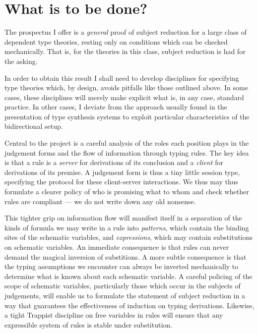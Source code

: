 \documentclass{jfp1}
\begin{document}
\section{What is to be done?}

The prospectus I offer is a \emph{general} proof of subject reduction for a
large class of dependent type theories, resting only on conditions which can
be checked mechanically. That is, for the theories in this class, subject
reduction is had for the asking.

In order to obtain this result I shall need to develop disciplines for
specifying type theories which, by design, avoids pitfalls like those
outlined above.  In some cases, these disciplines will merely make
explicit what is, in any case, standard practice. In other cases, I
deviate from the approach usually found in the presentation of type
synthesis systems to exploit particular characteristics of the
bidirectional setup.

Central to the project is a careful analysis of the roles each position
plays in the judgement forms and the flow of information through typing rules.
The key idea is that a rule is a \emph{server} for derivations of its conclusion
and a \emph{client} for derivations of its premise. A judgement form is thus a
tiny little session type, specifying the protocol for these client-server
interactions. We thus may thus formulate a clearer policy of who is promising
what to whom and check whether rules are compliant --- we do not write down
any old nonsense.

This tighter grip on information flow will manifest itself in a separation
of the kinds of formula we may write in a rule into \emph{patterns}, which contain
the binding sites of the schematic variables, and \emph{expressions}, which may
contain substitutions on schematic variables. An immediate consequence is
that rules can never demand the magical inversion of substitions. A more subtle
consequence is that the typing assumptions we encounter can always be inverted
mechanically to determine what is known about each schematic variable. A careful
policing of the scope of schematic variables, particularly
those which occur in the subjects of judgements, will enable us to formulate
the statement of subject reduction in a way that guarantees the effectiveness
of induction on typing derivations. Likewise, a tight Trappist discipline on
free variables in rules will ensure that any expressible system of rules is stable under
substitution.
\end{document}
